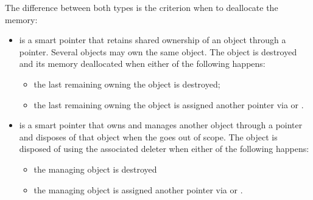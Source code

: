 The difference between both types is the criterion when to deallocate the memory:
\begin{itemize}
  \item {} is a smart pointer that retains shared ownership of an object through a pointer. Several  objects may own the
  same object. The object is destroyed and its memory deallocated when either of the following happens:
  \begin{itemize}
    \item the last remaining  owning the object is destroyed;
    \item the last remaining  owning the object is assigned another pointer via  or .
  \end{itemize}

  \item {} is a smart pointer that owns and manages another object through a pointer and disposes of that object when the
   goes out of scope. The object is disposed of using the associated deleter when either of the following happens:
  \begin{itemize}
    \item the managing  object is destroyed
    \item the managing  object is assigned another pointer via  or .
  \end{itemize}
\end{itemize}

